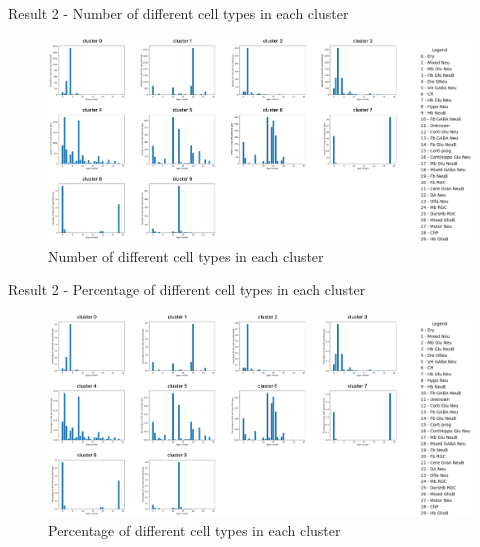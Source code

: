 \documentclass{beamer}
\begin{document}
\begin{frame}{Result 2 - Number of different cell types in each cluster}

\begin{figure}
    \centering
    \includegraphics[width=1\textwidth]{type_num_clusters4.png}
    \caption{Number of different cell types in each cluster}
\end{figure} 

\end{frame}
\begin{frame}{Result 2 - Percentage of different cell types in each cluster}

\begin{figure}
    \centering
    \includegraphics[width=1\textwidth]{type_p_clusters4.png}
    \caption{Percentage of different cell types in each cluster}
\end{figure} 

\end{frame}
\end{document}
